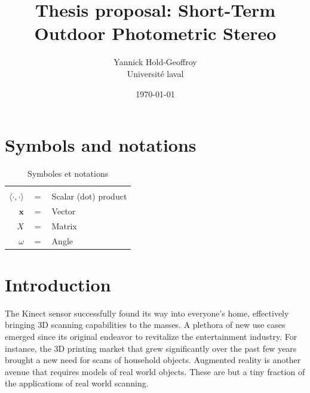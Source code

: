\documentclass{report}
\title{Thesis proposal: Short-Term Outdoor Photometric Stereo}
\author{Yannick Hold-Geoffroy  \\
    Universit\'e laval  \\
    }
\date{\today}
\begin{document}
\maketitle

\tableofcontents

\newcommand{\boldomega}{\boldsymbol \omega} %
\newcommand{\boldmu}{\boldsymbol \mu} %
\newcommand{\bolddelta}{\boldsymbol \delta} %

\graphicspath{{figures/}}



\chapter*{Symbols and notations}

\begin{table}[htbp]\caption{Symboles et notations}
\centering %
\begin{tabular}{r c p{10cm} }

\hline & & \\
$\langle \cdot, \cdot \rangle$      & $=$ & Scalar (dot) product \\
$\mathbf{x}$                        & $=$ & Vector \\
$X$                                 & $=$ & Matrix \\
$\omega$                            & $=$ & Angle \\
\hline
\end{tabular}
\label{tab:TableOfNotationForMyResearch}
\end{table}


\chapter{Introduction}


The Kinect sensor successfully found its way into everyone's home, effectively bringing 3D scanning capabilities to the masses. A plethora of new use cases emerged since its original endeavor to revitalize the entertainment industry. For instance, the 3D printing market that grew significantly over the past few years brought a new need for scans of household objects. Augmented reality is another avenue that requires models of real world objects. These are but a tiny fraction of the applications of real world scanning.
\end{document}
